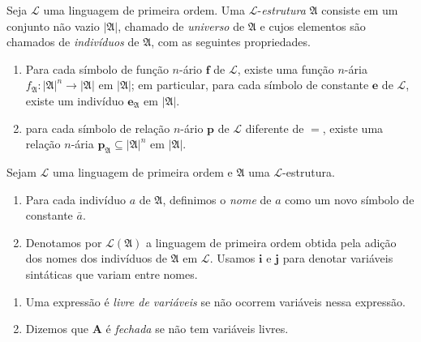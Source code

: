 \begin{definition}
    Seja $\mathcal{L}$ uma linguagem de primeira ordem. Uma $\mathcal{L}$-\emph{estrutura} $\mathfrak{A}$ consiste em um conjunto não vazio $|\mathfrak{A}|$, chamado de \emph{universo} de $\mathfrak{A}$ e cujos elementos são chamados de \emph{indivíduos} de $\mathfrak{A}$, com as seguintes propriedades.
        \begin{enumerate}[label=\roman*.]
            \item Para cada símbolo de função $n$-ário $\mathbf{f}$ de $\mathcal{L}$, existe uma função $n$-ária $f_{\mathfrak{A}} : |\mathfrak{A}|^n \to |\mathfrak{A}|$ em $|\mathfrak{A}|$; em particular, para cada símbolo de constante $\mathbf{e}$ de $\mathcal{L}$, existe um indivíduo $\mathbf{e}_{\mathfrak{A}}$ em $|\mathfrak{A}|$.
            \item para cada símbolo de relação $n$-ário $\mathbf{p}$ de $\mathcal{L}$ diferente de $=$, existe uma relação $n$-ária $\mathbf{p}_{\mathfrak{A}} \subseteq |\mathfrak{A}|^n$ em $|\mathfrak{A}|$.
        \end{enumerate}
\end{definition}

\begin{definition}
    Sejam $\mathcal{L}$ uma linguagem de primeira ordem e $\mathfrak{A}$ uma $\mathcal{L}$-estrutura.
        \begin{enumerate}[leftmargin=*, align=left, label=\textbf{(\alph*)}]
            \item Para cada indivíduo $a$ de $\mathfrak{A}$, definimos o \emph{nome} de $a$ como um novo símbolo de constante $\bar{a}$.
            \item Denotamos por $\mathcal{L}(\mathfrak{A})$ a linguagem de primeira ordem obtida pela adição dos nomes dos indivíduos de $\mathfrak{A}$ em $\mathcal{L}$. Usamos $\mathbf{i}$ e $\mathbf{j}$ para denotar variáveis sintáticas que variam entre nomes.
        \end{enumerate}
\end{definition}

\begin{definition}
    \leavevmode
        \begin{enumerate}[leftmargin=*, align=left, label=\textbf{(\alph*)}]
            \item Uma expressão é \emph{livre de variáveis} se não ocorrem variáveis nessa expressão.
            \item Dizemos que $\mathbf{A}$ é \emph{fechada} se não tem variáveis livres.
        \end{enumerate}
\end{definition}

